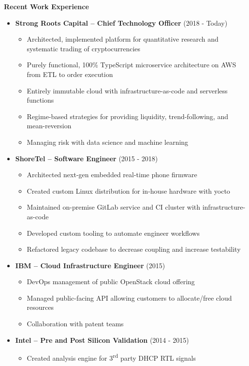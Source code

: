 \documentclass{report}
\begin{document}
\textbf{Recent Work Experience}
\begin{itemize}[label=$\cdot$]

\item \textbf{Strong Roots Capital -- Chief Technology Officer} (2018 - Today)
  \begin{itemize}[label=$\circ$]
  \item Architected, implemented platform for quantitative research and systematic trading of cryptocurrencies
  \item Purely functional, 100\% TypeScript microservice architecture on AWS from ETL to order execution
  \item Entirely immutable cloud with infrastructure-as-code and serverless functions
  \item Regime-based strategies for providing liquidity, trend-following, and mean-reversion
  \item Managing risk with data science and machine learning
  \end{itemize}

\item \textbf{ShoreTel -- Software Engineer} (2015 - 2018)
  \begin{itemize}[label=$\circ$]
  \item Architected next-gen embedded real-time phone firmware
  \item Created custom Linux distribution for in-house hardware with yocto
  \item Maintained on-premise GitLab service and CI cluster with infrastructure-as-code
  \item Developed custom tooling to automate engineer workflows
  \item Refactored legacy codebase to decrease coupling and increase testability
  \end{itemize}

\item \textbf{IBM -- Cloud Infrastructure Engineer} (2015)
  \begin{itemize}[label=$\circ$]
  \item DevOps management of public OpenStack cloud offering
  \item Managed public-facing API allowing customers to allocate/free cloud resources
  \item Collaboration with patent teams
  \end{itemize}

\item \textbf{Intel -- Pre and Post Silicon Validation} (2014 - 2015)
  \begin{itemize}[label=$\circ$]
  \item Created analysis engine for 3\textsuperscript{rd} party DHCP RTL signals
  \end{itemize}


\end{itemize}
\end{document}
